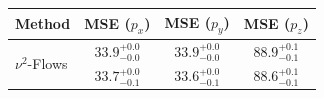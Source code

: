     \begin{tabular}{lccc}
        \toprule
        Method & MSE ($p_x$) & MSE ($p_y$) & MSE ($p_z$) \\
        \midrule
         \multirow{2}{*}{$\nu^2$-Flows}& $33.9_{-0.0}^{+0.0}$ & $33.9_{-0.0}^{+0.0}$ & $88.9_{-0.1}^{+0.1}$ \\
         & $33.7_{-0.1}^{+0.0}$ & $33.6_{-0.1}^{+0.0}$ & $88.6_{-0.1}^{+0.1}$ \\
        \bottomrule
    \end{tabular}